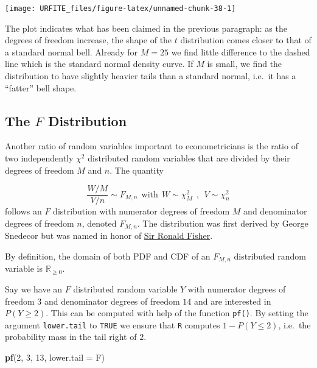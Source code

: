 \documentclass[]{book}
\newenvironment{Shaded}{\begin{snugshade}}{\end{snugshade}}
\newcommand{\KeywordTok}[1]{\textcolor[rgb]{0.13,0.29,0.53}{\textbf{#1}}}
\newcommand{\DataTypeTok}[1]{\textcolor[rgb]{0.13,0.29,0.53}{#1}}
\newcommand{\DecValTok}[1]{\textcolor[rgb]{0.00,0.00,0.81}{#1}}
\newcommand{\NormalTok}[1]{#1}
\theoremstyle{definition}
\theoremstyle{definition}
\theoremstyle{definition}
\theoremstyle{remark}
\begin{document}
\begin{center}\texttt{[image: URFITE\_files/figure-latex/unnamed-chunk-38-1]} \end{center}

The plot indicates what has been claimed in the previous paragraph: as
the degrees of freedom increase, the shape of the \(t\) distribution
comes closer to that of a standard normal bell. Already for \(M=25\) we
find little difference to the dashed line which is the standard normal
density curve. If \(M\) is small, we find the distribution to have
slightly heavier tails than a standard normal, i.e.~it has a ``fatter''
bell shape.

\subsection*{\texorpdfstring{The \(F\)
Distribution}{The F Distribution}}\label{the-f-distribution}

Another ratio of random variables important to econometricians is the
ratio of two independently \(\chi^2\) distributed random variables that
are divided by their degrees of freedom \(M\) and \(n\). The quantity

\[ \frac{W/M}{V/n} \sim F_{M,n} \ \ \text{with} \ \ W \sim \chi^2_M \ \ , \ \ V \sim \chi^2_n \]
follows an \(F\) distribution with numerator degrees of freedom \(M\)
and denominator degrees of freedom \(n\), denoted \(F_{M,n}\). The
distribution was first derived by George Snedecor but was named in honor
of \href{https://en.wikipedia.org/wiki/Ronald_Fisher}{Sir Ronald
Fisher}.

By definition, the domain of both PDF and CDF of an \(F_{M,n}\)
distributed random variable is \(\mathbb{R}_{\geq0}\).

Say we have an \(F\) distributed random variable \(Y\) with numerator
degrees of freedom \(3\) and denominator degrees of freedom \(14\) and
are interested in \(P(Y \geq 2)\). This can be computed with help of the
function \texttt{pf()}. By setting the argument \texttt{lower.tail} to
\texttt{TRUE} we ensure that \texttt{R} computes \(1- P(Y \leq 2)\),
i.e.~the probability mass in the tail right of \(2\).

\begin{Shaded}
\begin{Highlighting}[]
\KeywordTok{pf}\NormalTok{(}\DecValTok{2}\NormalTok{, }\DecValTok{3}\NormalTok{, }\DecValTok{13}\NormalTok{, }\DataTypeTok{lower.tail =}\NormalTok{ F)}
\end{Highlighting}
\end{Shaded}
\end{document}
